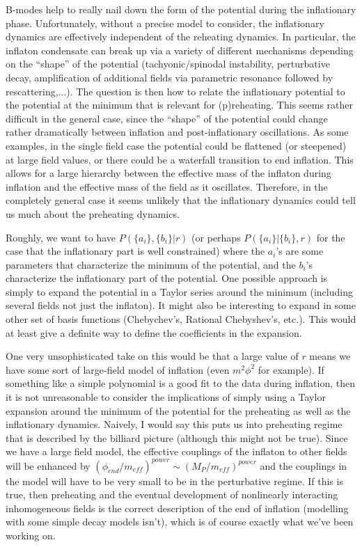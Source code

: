 \documentclass[11pt]{article}
\begin{document}
B-modes help to really nail down the form of the potential during the
inflationary phase.  
Unfortunately, without a precise model to consider, the inflationary
dynamics are effectively independent of the reheating dynamics.
In particular, the inflaton condensate can break up via a variety of
different mechanisms depending on the ``shape'' of the potential
(tachyonic/spinodal instability, perturbative decay, amplification of
additional fields via parametric resonance followed by rescattering,...). 
The question is then how to relate the inflationary potential to the
potential at the minimum that is relevant for (p)reheating.
This seems rather difficult in the general case, since the ``shape'' of the
potential could change rather dramatically between inflation and
post-inflationary oscillations.  As some examples, in the single field case
the potential could be flattened (or steepened) at large field values, or
there could be a waterfall transition to end inflation.  This allows for a
large hierarchy between the effective mass of the inflaton during inflation
and the effective mass of the field as it oscillates.  Therefore, in the
completely general case it seems unlikely that the inflationary dynamics
could tell us much about the preheating dynamics.

Roughly, we want to have $P(\{a_i\},\{b_i\}|r)$ (or perhaps
$P(\{a_i\}|\{b_i\},r)$ for the case that the inflationary part is well
constrained)
where the $a_i$'s are some parameters that characterize the minimum of the
potential, and the $b_i$'s characterize the inflationary part of the
potential.
One possible approach is simply to expand the potential in a Taylor series
around the minimum (including several fields not just the inflaton).
It might also be interesting to expand in some other set of basis functions
(Chebychev's, Rational Chebyshev's, etc.).
This would at least give a definite way to define the coefficients in the
expansion.

One very unsophisticated take on this would be that a large value of $r$
means we have some sort of large-field model of inflation (even $m^2\phi^2$
for example).
If something like a simple polynomial is a good fit to the data during
inflation, then it is not unreasonable to consider the implications of
simply using a Taylor expansion around the minimum of the potential for the
preheating as well as the inflationary dynamics.
Naively, I would say this puts us into preheating regime that is described
by the billiard picture (although this might not be true).
Since we have a large field model, the effective couplings of the inflaton
to other fields will be enhanced by $(\phi_{end}/m_{eff})^{power} \sim
(M_P/m_{eff})^{power}$ and the couplings in the model will have to be very
small to be in the perturbative regime.
If this is true, then preheating and the eventual development of
nonlinearly interacting inhomogeneous fields is the correct description of
the end of inflation (modelling with some simple decay models isn't), which
is of course exactly what we've been working on.
\end{document}
